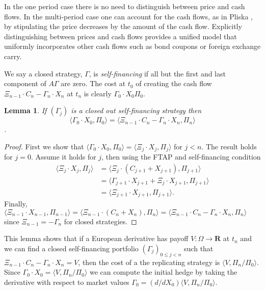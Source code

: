 \documentclass[fleqn]{amsart}
\newcommand{\R}{\mathbf{R}}
\providecommand{\pair}[1]{\langle#1\rangle}
\newtheorem{lemma}[theorem]{Lemma}
\begin{document}
In the one period case there is no need to distinguish between price and
cash flows. In the multi-period case one can account for the cash flows,
as in Pliska \cite{Pli1997}, by stipulating the price decreases by the
amount of the cash flow. Explicitly distinguishing
between prices and cash flows provides a unified model that uniformly incorporates 
other cash flows such as bond coupons or foreign exchange carry.

We say a closed strategy, $\Gamma$, is {\em self-financing} if all but the first
and last component of $A\Gamma$ are zero. The cost at $t_0$ of creating the
cash flow $\Xi_{n-1}\cdot C_n - \Gamma_n\cdot X_n$ at $t_n$ is clearly $\Gamma_0\cdot X_0\Pi_0$.

\begin{lemma}
If \((\Gamma_j)\) is a closed out self-financing strategy then 
\[\pair{\Gamma_0\cdot X_0, \Pi_0}
= \pair{\Xi_{n-1}\cdot C_n - \Gamma_n\cdot X_n, \Pi_n}\].
\end{lemma}
\begin{proof}
First we show that \(\pair{\Gamma_0\cdot X_0, \Pi_0} 
= \pair{\Xi_j\cdot X_j, \Pi_j}\) 
for \(j < n\).
The result holds for \(j = 0\). Assume it holds for \(j\),
then using the FTAP and self-financing condition
\begin{align*}
\pair{\Xi_j\cdot X_j, \Pi_j} 
&= \pair{\Xi_j\cdot(C_{j+1} + X_{j+1}), \Pi_{j+1}}\\
&= \pair{\Gamma_{j+1}\cdot X_{j+1} + \Xi_j\cdot X_{j+1}, \Pi_{j+1}}\\
&= \pair{\Xi_{j+1}\cdot X_{j+1}, \Pi_{j+1}}.
\end{align*}
Finally, \(\pair{\Xi_{n-1}\cdot X_{n-1}, \Pi_{n-1}}
= \pair{\Xi_{n-1}\cdot (C_n + X_n), \Pi_n}
= \pair{\Xi_{n-1}\cdot C_n - \Gamma_n\cdot X_n, \Pi_n}\)
since \(\Xi_{n-1} = -\Gamma_n\) for closed strategies.
\end{proof}

This lemma shows that
if a European derivative has payoff $V\colon\Omega\to\R$ at $t_n$ and
we can find a closed self-financing portfolio $(\Gamma_j)_{0\le j < n}$
such that $\Xi_{n-1}\cdot C_n - \Gamma_n\cdot X_n = V$, then the cost of a 
the replicating strategy is $\pair{V, \Pi_n/\Pi_0}$.
Since \(\Gamma_0\cdot X_0 = \pair{V, \Pi_n/\Pi_0}\) we can compute the initial
hedge by taking the derivative with respect to market values
\(\Gamma_0 = (d/dX_0) \pair{V, \Pi_n/\Pi_0}\). 
\end{document}
